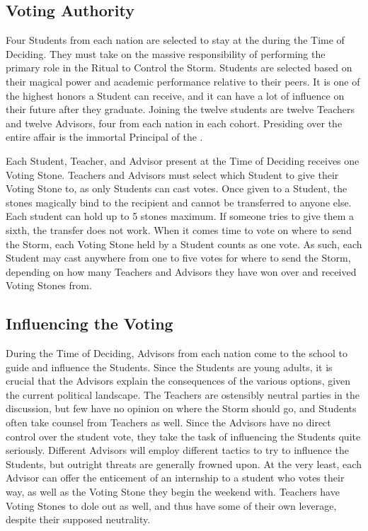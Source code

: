 \documentclass[blue]{GL2020}
\begin{document}
\subsection*{Voting Authority}
Four Students from each nation are selected to stay at the \pSc{} during the Time of Deciding. They must take on the massive responsibility of performing the primary role in the Ritual to Control the Storm. Students are selected based on their magical power and academic performance relative to their peers. It is one of the highest honors a Student can receive, and it can have a lot of influence on their future after they graduate. Joining the twelve students are twelve Teachers and twelve Advisors, four from each nation in each cohort. Presiding over the entire affair is the immortal Principal of the \pSchool{}.

Each Student, Teacher, and Advisor present at the Time of Deciding receives one Voting Stone. Teachers and Advisors must select which Student to give their Voting Stone to, as only Students can cast votes. Once given to a Student, the stones magically bind to the recipient and cannot be transferred to anyone else. Each student can hold up to 5 stones maximum. If someone tries to give them a sixth, the transfer does not work. When it comes time to vote on where to send the Storm, each Voting Stone held by a Student counts as one vote. As such, each Student may cast anywhere from one to five votes for where to send the Storm, depending on how many Teachers and Advisors they have won over and received Voting Stones from.

\subsection*{Influencing the Voting}
During the Time of Deciding, Advisors from each nation come to the school to guide and influence the Students. Since the Students are young adults, it is crucial that the Advisors explain the consequences of the various options, given the current political landscape. The Teachers are ostensibly neutral parties in the discussion, but few have no opinion on where the Storm should go, and Students often take counsel from Teachers as well. Since the Advisors have no direct control over the student vote, they take the task of influencing the Students quite seriously. Different Advisors will employ different tactics to try to influence the Students, but outright threats are generally frowned upon. At the very least, each Advisor can offer the enticement of an internship to a student who votes their way, as well as the Voting Stone they begin the weekend with. Teachers have Voting Stones to dole out as well, and thus have some of their own leverage, despite their supposed neutrality.
\end{document}

